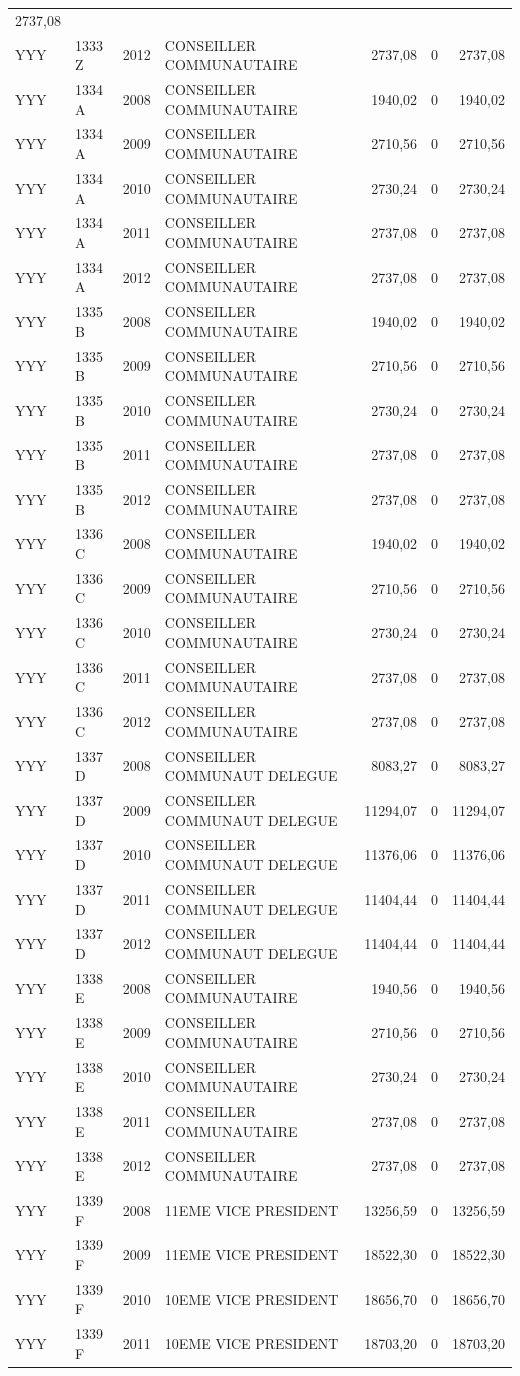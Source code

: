\begin{longtable}[]{@{}llrlrrr@{}}
2737,08\tabularnewline
YYY & 1333 Z & 2012 & CONSEILLER COMMUNAUTAIRE & 2737,08 & 0 &
2737,08\tabularnewline
YYY & 1334 A & 2008 & CONSEILLER COMMUNAUTAIRE & 1940,02 & 0 &
1940,02\tabularnewline
YYY & 1334 A & 2009 & CONSEILLER COMMUNAUTAIRE & 2710,56 & 0 &
2710,56\tabularnewline
YYY & 1334 A & 2010 & CONSEILLER COMMUNAUTAIRE & 2730,24 & 0 &
2730,24\tabularnewline
YYY & 1334 A & 2011 & CONSEILLER COMMUNAUTAIRE & 2737,08 & 0 &
2737,08\tabularnewline
YYY & 1334 A & 2012 & CONSEILLER COMMUNAUTAIRE & 2737,08 & 0 &
2737,08\tabularnewline
YYY & 1335 B & 2008 & CONSEILLER COMMUNAUTAIRE & 1940,02 & 0 &
1940,02\tabularnewline
YYY & 1335 B & 2009 & CONSEILLER COMMUNAUTAIRE & 2710,56 & 0 &
2710,56\tabularnewline
YYY & 1335 B & 2010 & CONSEILLER COMMUNAUTAIRE & 2730,24 & 0 &
2730,24\tabularnewline
YYY & 1335 B & 2011 & CONSEILLER COMMUNAUTAIRE & 2737,08 & 0 &
2737,08\tabularnewline
YYY & 1335 B & 2012 & CONSEILLER COMMUNAUTAIRE & 2737,08 & 0 &
2737,08\tabularnewline
YYY & 1336 C & 2008 & CONSEILLER COMMUNAUTAIRE & 1940,02 & 0 &
1940,02\tabularnewline
YYY & 1336 C & 2009 & CONSEILLER COMMUNAUTAIRE & 2710,56 & 0 &
2710,56\tabularnewline
YYY & 1336 C & 2010 & CONSEILLER COMMUNAUTAIRE & 2730,24 & 0 &
2730,24\tabularnewline
YYY & 1336 C & 2011 & CONSEILLER COMMUNAUTAIRE & 2737,08 & 0 &
2737,08\tabularnewline
YYY & 1336 C & 2012 & CONSEILLER COMMUNAUTAIRE & 2737,08 & 0 &
2737,08\tabularnewline
YYY & 1337 D & 2008 & CONSEILLER COMMUNAUT DELEGUE & 8083,27 & 0 &
8083,27\tabularnewline
YYY & 1337 D & 2009 & CONSEILLER COMMUNAUT DELEGUE & 11294,07 & 0 &
11294,07\tabularnewline
YYY & 1337 D & 2010 & CONSEILLER COMMUNAUT DELEGUE & 11376,06 & 0 &
11376,06\tabularnewline
YYY & 1337 D & 2011 & CONSEILLER COMMUNAUT DELEGUE & 11404,44 & 0 &
11404,44\tabularnewline
YYY & 1337 D & 2012 & CONSEILLER COMMUNAUT DELEGUE & 11404,44 & 0 &
11404,44\tabularnewline
YYY & 1338 E & 2008 & CONSEILLER COMMUNAUTAIRE & 1940,56 & 0 &
1940,56\tabularnewline
YYY & 1338 E & 2009 & CONSEILLER COMMUNAUTAIRE & 2710,56 & 0 &
2710,56\tabularnewline
YYY & 1338 E & 2010 & CONSEILLER COMMUNAUTAIRE & 2730,24 & 0 &
2730,24\tabularnewline
YYY & 1338 E & 2011 & CONSEILLER COMMUNAUTAIRE & 2737,08 & 0 &
2737,08\tabularnewline
YYY & 1338 E & 2012 & CONSEILLER COMMUNAUTAIRE & 2737,08 & 0 &
2737,08\tabularnewline
YYY & 1339 F & 2008 & 11EME VICE PRESIDENT & 13256,59 & 0 &
13256,59\tabularnewline
YYY & 1339 F & 2009 & 11EME VICE PRESIDENT & 18522,30 & 0 &
18522,30\tabularnewline
YYY & 1339 F & 2010 & 10EME VICE PRESIDENT & 18656,70 & 0 &
18656,70\tabularnewline
YYY & 1339 F & 2011 & 10EME VICE PRESIDENT & 18703,20 & 0 &
18703,20\tabularnewline

\end{longtable}
